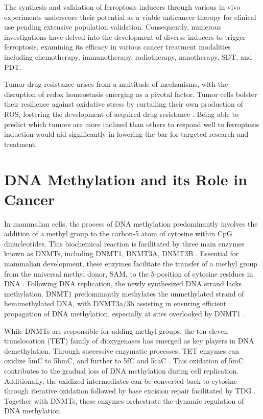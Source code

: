 The synthesis and validation of ferroptosis inducers through various in vivo experiments underscore their potential as a viable anticancer therapy for clinical use pending extensive population validation. Consequently, numerous investigations have delved into the development of diverse inducers to trigger ferroptosis, examining its efficacy in various cancer treatment modalities including chemotherapy, immunotherapy, radiotherapy, nanotherapy, \ac{SDT}, and \ac{PDT}.

Tumor drug resistance arises from a multitude of mechanisms, with the disruption of redox homeostasis emerging as a pivotal factor. Tumor cells bolster their resilience against oxidative stress by curtailing their own production of \ac{ROS}, fostering the development of acquired drug resistance \citep{ferro_res}. Being able to predict which tumors are more inclined than others to respond well to ferroptosis induction would aid significantly in lowering the bar for targeted research and treatment.

\section{DNA Methylation and its Role in Cancer}

In mammalian cells, the process of DNA methylation predominantly involves the addition of a methyl group to the carbon-5 atom of cytosine within \ac{CpG} dinucleotides. This biochemical reaction is facilitated by three main enzymes known as \acp{DNMT}, including DNMT1, DNMT3A, DNMT3B \citep{dnmt_enzymes}. Essential for mammalian development, these enzymes facilitate the transfer of a methyl group from the universal methyl donor, \ac{SAM}, to the 5-position of cytosine residues in DNA \citep{dnmt}. Following DNA replication, the newly synthesized DNA strand lacks methylation. DNMT1 predominantly methylates the unmethylated strand of hemimethylated DNA, with DNMT3a/3b assisting in ensuring efficient propagation of DNA methylation, especially at sites overlooked by DNMT1 \citep{dnmt_enzymes}.

While \acp{DNMT} are responsible for adding methyl groups, the ten-eleven translocation (\ac{TET}) family of dioxygenases has emerged as key players in DNA demethylation. Through successive enzymatic processes, \ac{TET} enzymes can oxidize \ac{5mC} to \ac{5hmC}, and further to \ac{5fC} and \ac{5caC} \citep{tet}. This oxidation of \ac{5mC} contributes to the gradual loss of DNA methylation during cell replication. Additionally, the oxidized intermediates can be converted back to cytosine through iterative oxidation followed by base excision repair facilitated by \ac{TDG} \citep{demeth}. Together with \acp{DNMT}, these enzymes orchestrate the dynamic regulation of DNA methylation.

